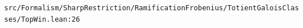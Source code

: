 \nolinkurl{src/Formalism/SharpRestriction/RamificationFrobenius/TotientGaloisClasses/TopWin.lean:26}%
